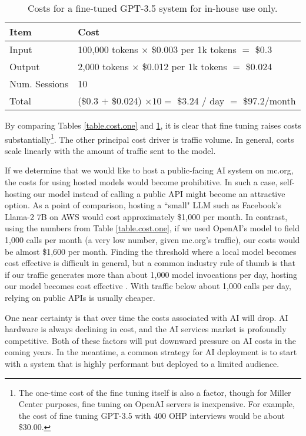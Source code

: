 \documentclass[12pt, oneside]{article}   	%
\begin{document}
\begin{table}[htp]
\caption{Costs for a fine-tuned GPT-3.5 system for in-house use only.}
\begin{center}
\begin{tabular}{p{1.55in} p{4in}}
\toprule
Item			&		Cost	\\
\midrule
Input			&	100,000 tokens $\times$ \$0.003 per 1k tokens $=$ \$0.3	\\
\midrule
Output		&	2,000 tokens $\times$ \$0.012 per 1k tokens $=$ \$0.024	\\
\midrule
Num. Sessions	&	10	\\
\bottomrule			
Total			&	(\$0.3 $+$ \$0.024)	$\times 10 =$ \$3.24 / day $=$ \$97.2/month	\\
\bottomrule
\end{tabular}
\end{center}
\label{table.cost.two}
\end{table}%

By comparing Tables \ref{table.cost.one} and \ref{table.cost.two}, it is clear that fine tuning raises costs substantially\footnote{The one-time cost of the fine tuning itself is also a factor, though for Miller Center purposes, fine tuning on OpenAI servers is inexpensive.  For example, the cost of fine tuning GPT-3.5 with 400 OHP interviews would be about \$30.00.}.  The other principal cost driver is traffic volume.  In general, costs scale linearly with the amount of traffic sent to the model.  

If we determine that we would like to host a public-facing AI system on mc.org, the costs for using hosted models would become prohibitive.  In such a case, self-hosting our  model  instead of calling a  public API  might become an attractive option.  As a point of comparison, hosting a ``small" LLM such as Facebook's Llama-2 7B on AWS would cost approximately \$1,000 per month.  In contrast, using the numbers from Table \ref{table.cost.one}, if we used OpenAI's model to field 1,000 calls per month (a very low number, given mc.org's traffic), our costs would be almost \$1,600 per month.  Finding the threshold where a local model becomes cost effective is difficult in general, but a  common industry rule of thumb is that if our traffic generates more than about 1,000 model invocations per day, hosting our model becomes cost effective \cite{vivek:2023, javaness:2023}.  With traffic below about 1,000 calls per day, relying on public APIs is usually cheaper.  

One near certainty is that over time the costs associated with AI will drop.  AI hardware is always declining in cost, and the AI services market is profoundly competitive.  Both of these factors will put downward pressure on AI costs in the coming years.  In the meantime, a common strategy for AI deployment is to start with a system that is highly performant but deployed to a limited audience.  
\end{document}
